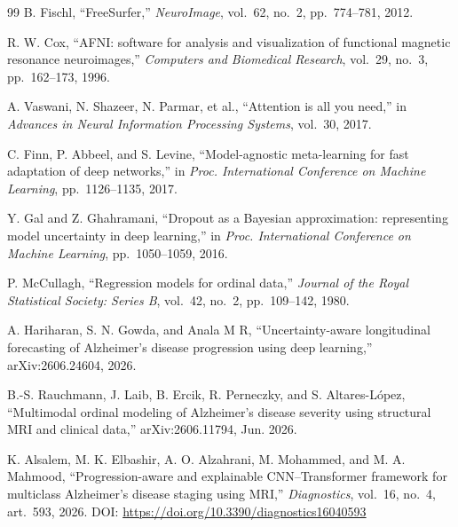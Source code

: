 \documentclass{ssnreview}
\begin{document}
\begin{thebibliography}{99}
 B. Fischl, ``FreeSurfer,'' \textit{NeuroImage}, vol.~62, no.~2,
pp.~774--781, 2012.

 R. W. Cox, ``AFNI: software for analysis and visualization of
functional magnetic resonance neuroimages,'' \textit{Computers and Biomedical
Research}, vol.~29, no.~3, pp.~162--173, 1996.

 A. Vaswani, N. Shazeer, N. Parmar, et al., ``Attention is all you need,'' in \textit{Advances in Neural Information Processing Systems}, vol.~30, 2017.

 C. Finn, P. Abbeel, and S. Levine, ``Model-agnostic meta-learning for fast adaptation of deep networks,'' in \textit{Proc. International Conference on Machine Learning}, pp.~1126--1135, 2017.

 Y. Gal and Z. Ghahramani, ``Dropout as a Bayesian approximation: representing model uncertainty in deep learning,'' in \textit{Proc. International Conference on Machine Learning}, pp.~1050--1059, 2016.

 P. McCullagh, ``Regression models for ordinal data,'' \textit{Journal of the Royal Statistical Society: Series B}, vol.~42, no.~2, pp.~109--142, 1980.


 A. Hariharan, S. N. Gowda, and Anala M R, ``Uncertainty-aware longitudinal forecasting of Alzheimer's disease progression using deep learning,'' arXiv:2606.24604, 2026.

 B.-S. Rauchmann, J. Laib, B. Ercik, R. Perneczky, and S. Altares-L\'opez, ``Multimodal ordinal modeling of Alzheimer's disease severity using structural MRI and clinical data,'' arXiv:2606.11794, Jun. 2026.

 K. Alsalem, M. K. Elbashir, A. O. Alzahrani, M. Mohammed, and M. A. Mahmood, ``Progression-aware and explainable CNN--Transformer framework for multiclass Alzheimer's disease staging using MRI,'' \textit{Diagnostics}, vol.~16, no.~4, art.~593, 2026. DOI: \url{https://doi.org/10.3390/diagnostics16040593}
\end{thebibliography}
\endgroup
\end{document}
